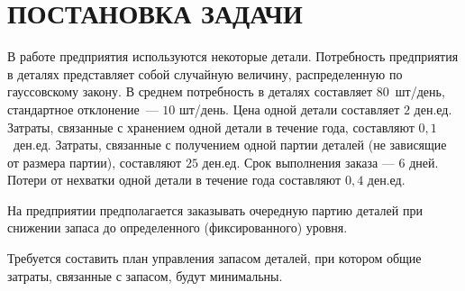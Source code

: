 \section{ПОСТАНОВКА ЗАДАЧИ}

В работе предприятия используются некоторые детали.
Потребность предприятия в деталях представляет собой случайную величину,
распределенную по гауссовскому закону. В среднем потребность в
деталях составляет $80$ шт/день, стандартное отклонение --- $10$ шт/день.
Цена одной детали составляет $2$ ден.ед.
Затраты, связанные с хранением одной детали в течение года,
составляют $0,1$ ден.ед. Затраты, связанные с получением
одной партии деталей (не зависящие от размера партии),
составляют $25$ ден.ед. Срок выполнения заказа --- $6$ дней.
Потери от нехватки одной детали в течение года составляют $0,4$ ден.ед.

На предприятии предполагается заказывать очередную партию деталей
при снижении запаса до определенного (фиксированного) уровня.

Требуется составить план управления запасом деталей,
при котором общие затраты, связанные с запасом, будут минимальны.



    




